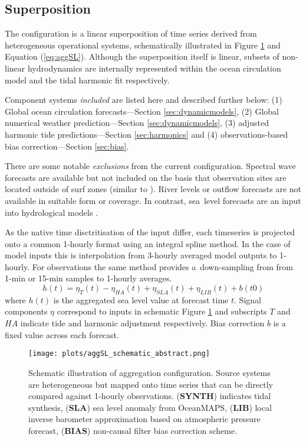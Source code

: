\subsection{Superposition}
\label{sec:concept}
The configuration is a linear superposition of time series derived from heterogeneous operational systems, schematically illustrated in Figure \ref{fig:aggSL} and Equation (\ref{eq:aggSL}).  
Although the superposition itself is linear, subsets of non-linear hydrodynamics are internally represented within the ocean circulation model  and the tidal harmonic fit respectively.

Component systems \textit{included} are listed here and described further below:
(1) Global ocean circulation forecasts---Section \ref{sec:dynamicmodels}, 
(2) Global numerical weather prediction---Section \ref{sec:dynamicmodels}, 
(3) adjusted harmonic tide predictions---Section \ref{sec:harmonics} and 
(4) observations-based bias correction---Section \ref{sec:bias}.

There are some notable \textit{exclusions} from the current configuration.
Spectral wave forecasts are available but not included on the basis that observation sites are located outside of surf zones (similar to  \cite{Tilburg:2004cg}).
River levels or outflow forecasts are not available in suitable form or coverage. In contrast, sea~level forecasts are an input into hydrological models \cite{Taylor:2011ud}.  

As the native time disctritisation of the input differ, each timeseries is projected onto a common 1-hourly format using an integral spline method.  
In the case of model inputs this is interpolation from 3-hourly averaged model outputs to 1-hourly.  
For observations the same method provides a~down-sampling from from 1-min or 15-min samples to 1-hourly averages.  
\begin{equation}
h(t) = \eta_{T}(t) - \eta_{HA}(t) + \eta_{SLA}(t) + \eta_{LIB}(t) + b(t0)
\label{eq:aggSL}
\end{equation}
where $h(t)$ is the aggregated sea level value at forecast time $t$.  
Signal components $\eta$ correspond to inputs in schematic Figure \ref{fig:aggSL} and subscripts $T$ and $HA$ indicate tide and harmonic adjustment respectively.    
Bias correction $b$ is a fixed value across each forecast.
\vspace{6pt}
\begin{figure}[H]
\centering
\texttt{[image: plots/aggSL\_schematic\_abstract.png]}
\caption{Schematic illustration of aggregation configuration.  Source systems are heterogeneous but mapped onto time series that can be directly compared against 1-hourly observations.  (\textbf{SYNTH}) indicates tidal synthesis, (\textbf{SLA}) sea level anomaly from OceanMAPS, (\textbf{LIB}) local inverse barometer approximation based on atmospheric pressure forecast, (\textbf{BIAS}) non-causal filter bias correction scheme. }
\label{fig:aggSL}
\end{figure}   



